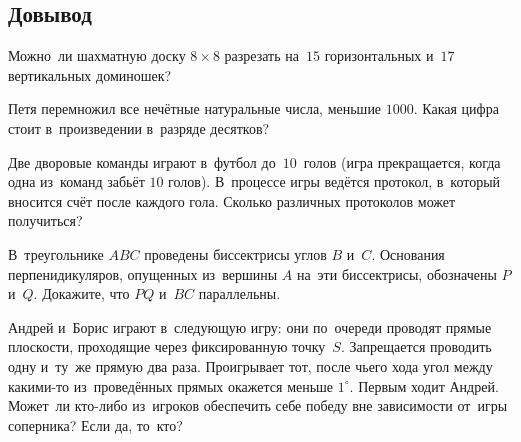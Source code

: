 


\subsection*{Довывод}

\begin{problems}

\item
Можно~ли шахматную доску $8 \times 8$ разрезать на~$15$ горизонтальных
и~$17$ вертикальных доминошек?

\item
Петя перемножил все нечётные натуральные числа, меньшие $1000$.
Какая цифра стоит в~произведении в~разряде десятков?

\item
Две дворовые команды играют в~футбол до~$10$~голов
(игра прекращается, когда одна из~команд забьёт $10$ голов).
В~процессе игры ведётся протокол, в~который вносится счёт после каждого гола.
Сколько различных протоколов может получиться?

\item
В~треугольнике $ABC$ проведены биссектрисы углов $B$ и~$C$.
Основания перпенидикуляров, опущенных из~вершины $A$ на~эти биссектрисы,
обозначены $P$ и~$Q$.
Докажите, что $PQ$ и~$BC$ параллельны.

\item
Андрей и~Борис играют в~следующую игру: они по~очереди проводят прямые
плоскости, проходящие через фиксированную точку~$S$.
Запрещается проводить одну и~ту~же прямую два раза.
Проигрывает тот, после чьего хода угол между какими-то из~проведённых прямых
окажется меньше $1^{\circ}$.
Первым ходит Андрей.
Может~ли кто-либо из~игроков обеспечить себе победу вне зависимости от~игры
соперника?
Если да, то~кто?

\end{problems}

